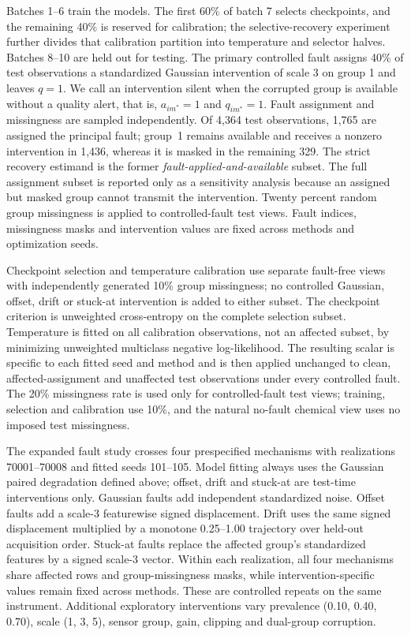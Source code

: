 \documentclass[11pt]{article}
\begin{document}
Batches 1--6 train the models. The first 60\% of batch 7 selects checkpoints, and the remaining 40\% is reserved for calibration; the selective-recovery experiment further divides that calibration partition into temperature and selector halves. Batches 8--10 are held out for testing. The primary controlled fault assigns 40\% of test observations a standardized Gaussian intervention of scale 3 on group 1 and leaves $q=1$. We call an intervention silent when the corrupted group is available without a quality alert, that is, $a_{im^*}=1$ and $q_{im^*}=1$. Fault assignment and missingness are sampled independently. Of 4,364 test observations, 1,765 are assigned the principal fault; group~1 remains available and receives a nonzero intervention in 1,436, whereas it is masked in the remaining 329. The strict recovery estimand is the former \emph{fault-applied-and-available} subset. The full assignment subset is reported only as a sensitivity analysis because an assigned but masked group cannot transmit the intervention. Twenty percent random group missingness is applied to controlled-fault test views. Fault indices, missingness masks and intervention values are fixed across methods and optimization seeds.

Checkpoint selection and temperature calibration use separate fault-free views with independently generated 10\% group missingness; no controlled Gaussian, offset, drift or stuck-at intervention is added to either subset. The checkpoint criterion is unweighted cross-entropy on the complete selection subset. Temperature is fitted on all calibration observations, not an affected subset, by minimizing unweighted multiclass negative log-likelihood. The resulting scalar is specific to each fitted seed and method and is then applied unchanged to clean, affected-assignment and unaffected test observations under every controlled fault. The 20\% missingness rate is used only for controlled-fault test views; training, selection and calibration use 10\%, and the natural no-fault chemical view uses no imposed test missingness.

The expanded fault study crosses four prespecified mechanisms with realizations 70001--70008 and fitted seeds 101--105. Model fitting always uses the Gaussian paired degradation defined above; offset, drift and stuck-at are test-time interventions only. Gaussian faults add independent standardized noise. Offset faults add a scale-3 featurewise signed displacement. Drift uses the same signed displacement multiplied by a monotone 0.25--1.00 trajectory over held-out acquisition order. Stuck-at faults replace the affected group's standardized features by a signed scale-3 vector. Within each realization, all four mechanisms share affected rows and group-missingness masks, while intervention-specific values remain fixed across methods. These are controlled repeats on the same instrument. Additional exploratory interventions vary prevalence (0.10, 0.40, 0.70), scale (1, 3, 5), sensor group, gain, clipping and dual-group corruption.
\end{document}
